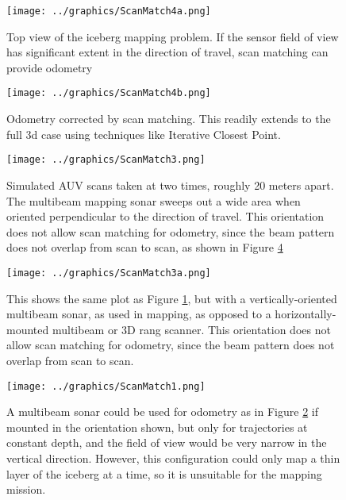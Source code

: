 \begin{figure}[htbp]
   \centering
   \texttt{[image: ../graphics/ScanMatch4a.png]} %
   \caption{Top view of the iceberg mapping problem. If the sensor field of view has significant extent in the direction of travel, scan matching can provide odometry}
   \label{fig:ScanMatch1}
   \end{figure}
    \begin{figure}[h]
   \centering
   \texttt{[image: ../graphics/ScanMatch4b.png]} %
   \caption{Odometry corrected by scan matching. This readily extends to the full 3d case using techniques like Iterative Closest Point.}
   \label{fig:ScanMatch2}
\end{figure}

\begin{figure}[h]
   \centering
   \texttt{[image: ../graphics/ScanMatch3.png]} %
   \caption{Simulated AUV scans taken at two times, roughly 20 meters apart. The multibeam mapping sonar sweeps out a wide area when oriented perpendicular to the direction of travel. This orientation does not allow scan matching for odometry, since the beam pattern does not overlap from scan to scan, as shown in Figure \ref{fig:NoMatch}}
   \label{fig:beamOrientation}
\end{figure}

\begin{figure}[h]
   \centering
   \texttt{[image: ../graphics/ScanMatch3a.png]} %
   \caption{This shows the same plot as Figure \ref{fig:ScanMatch1}, but with a vertically-oriented multibeam sonar, as used in mapping, as opposed to a horizontally-mounted multibeam or 3D rang scanner. This orientation does not allow scan matching for odometry, since the beam pattern does not overlap from scan to scan.}
   \label{fig:NoMatch}
\end{figure}

\begin{figure}[h]
   \centering
   \texttt{[image: ../graphics/ScanMatch1.png]} %
   \caption{A multibeam sonar could be used for odometry as in Figure \ref{fig:ScanMatch2} if mounted in the orientation shown, but only for trajectories at constant depth, and the field of view would be very narrow in the vertical direction. However, this configuration could only map a thin layer of the iceberg at a time, so it is unsuitable for the mapping mission.}
   \label{fig:ScanMatchMultibeam}
\end{figure}

